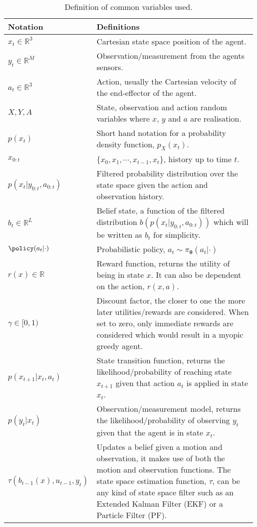 \begin{table}
\begin{center}
\renewcommand{\arraystretch}{1.5}
\begin{tabular}{|l|p{9cm}|} 
\hline
    \textbf{Notation} 			 	& \textbf{Definitions} \\ \hline\hline
    $x_t \in \mathbb{R}^3$ 		 	& Cartesian state space position of the agent.\\
    $y_t \in \mathbb{R}^{M}$		 	& Observation/measurement from the agents sensors.\\
    $a_t \in \mathbb{R}^3$		 	& Action, usually the Cartesian velocity of the end-effector of the agent.\\
    $X,Y,A$				 	& State, observation and action random variables where $x$, $y$ and $a$ are realisation.\\
    $p(x_t)$ 					& Short hand notation for a probability density function, $p_{X}(x_t)$.\\
    $x_{0:t}$					& $\{x_0,x_1,\cdots,x_{t-1},x_t\}$, history up to time $t$.\\
    $p(x_t|y_{0:t},a_{0:t})$	 		& Filtered probability distribution over the state space given the action and observation history.\\
    $b_t \in \mathbb{R}^{L}$			& Belief state, a function of the filtered distribution 
						 $b(p(x_t|y_{0:t},a_{0:t}))$ which will be written as $b_t$ for simplicity.\\
    $\policy(a_t|\cdot)$ 				& Probabilistic policy, $a_t \sim \pi_{\boldsymbol{\theta}}(a_t|\cdot)$ \\
    $r(x) \in \mathbb{R}$			& Reward function, returns the utility of being in state $x$. It can also be dependent on the action, $r(x,a)$.\\
    $\gamma \in [0,1)$				& Discount factor, the closer to one the more later utilities/rewards are considered. When set to zero, only immediate rewards are 
						  considered which would result in a myopic greedy agent.\\
    $p(x_{t+1}|x_t,a_t)$			& State transition function, returns the likelihood/probability of reaching state $x_{t+1}$ given that action $a_t$ is applied in state $x_t$.\\	
    $p(y_t|x_t)$				& Observation/measurement model, returns the likelihood/probability of observing $y_t$ given that the agent is in state $x_t$.\\
    $\tau(b_{t-1}(x),u_{t-1},y_t)$		& Updates a belief given a motion and observation, it makes use of both the motion and observation functions. The state space estimation function, $\tau$, can be any kind of state space filter such as an Extended Kalman Filter (EKF) or a Particle Filter (PF).
    \\ \hline
\end{tabular}
\end{center}
\caption{Definition of common variables used.}
\label{tab:notation}
\end{table}


